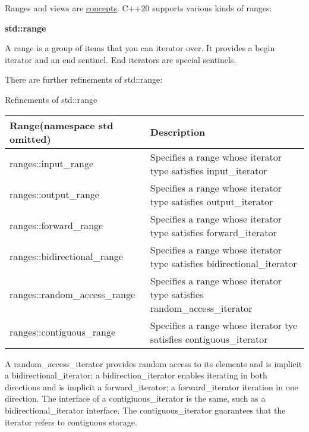 Ranges and views are \href{https://en.cppreference.com/w/cpp/language/constraint}{concepts}. C++20 supports various kinds of ranges: 

\noindent
\textbf{std::range }

A range is a group of items that you can iterator over. It provides a begin iterator and an end sentinel. End iterators are special sentinels.

There are further refinements of std::range:

\begin{center}
Refinements of std::range
\end{center}

\begin{longtable}[c]{|l|l|}
\hline
\textbf{Range(namespace std omitted)} & \textbf{Description}                                              \\ \hline
\endfirsthead
%
\endhead
%
ranges::input\_range                  & Specifies a range whose iterator type satisfies input\_iterator   \\ \hline
ranges::output\_range                 & Specifies a range whose iterator type satisfies output\_iterator  \\ \hline
ranges::forward\_range                & Specifies a range whose iterator type satisfies forward\_iterator \\ \hline
ranges::bidirectional\_range  & Specifies a range whose iterator type satisfies bidirectional\_iterator  \\ \hline
ranges::random\_access\_range & Specifies a range whose iterator type satisfies random\_access\_iterator \\ \hline
ranges::contiguous\_range     & Specifies a range whose iterator tye satisfies contiguous\_iterator      \\ \hline
\end{longtable}


A random\_access\_iterator provides random access to its elements and is implicit a bidirectional\_iterator; a bidirection\_iterator enables iterating in both directions and is implicit a forward\_iterator; a forward\_iterator iteration in one direction. The interface of a contigiuous\_iterator is the same, such as a bidirectional\_iterator interface. The contiguous\_iterator guarantees that the iterator refers to contiguous storage.

